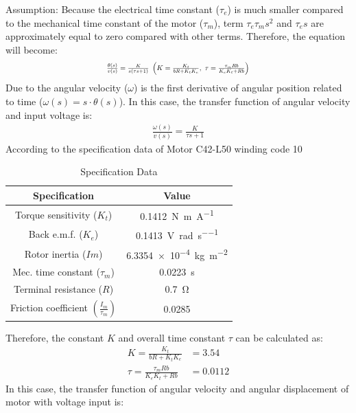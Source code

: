 \documentclass[conference]{IEEEtran}
\begin{document}
Assumption: Because the electrical time constant ($\tau_e$) is much smaller compared to the mechanical time constant of the motor ($\tau_m$), term $\tau_e\tau_ms^2$ and $\tau_es$ are approximately equal to zero compared with other terms. Therefore, the equation will become:
\begin{align}
    \resizebox{.43 \textwidth}{!}
    {$
    \frac{\theta (s)}{v(s)} = \frac{K}{s(\tau s + 1)} \ \left( K = \frac{K_t}{bR + K_t K_e}, \ \tau = \frac{\tau_m Rb}{K_e K_t + Rb} \right)
    $}
\end{align}
Due to the angular velocity ($\omega$) is the first derivative of angular position related to time ($\omega\left(s\right)=s\cdot\theta\left(s\right)$). In this case, the transfer function of angular velocity and input voltage is:
\begin{align}
    \frac{\omega(s)}{v(s)} = \frac{K}{\tau s + 1}
\end{align}
According to the specification data of Motor C42-L50 winding code 10 
\begin{table}[htbp]
    \caption{Specification Data \cite{b1}}
    \begin{center}
    \begin{tabular}{|c|c|}
    \hline
    \textbf{Specification} & \textbf{Value}\\
    \hline
    \hline
    Torque sensitivity ($K_t$) & \SI{0.1412}{\newton\metre\per\ampere}\\
    \hline
    Back e.m.f. ($K_e$) & \SI{0.1413}{\volt\per\radian\per\second}\\
    \hline
    Rotor inertia ($Im$) & \SI{6.3354e-4}{\kg\per\meter\squared}\\
    \hline
    Mec. time constant ($\tau_m$) & \SI{0.0223}{\second}\\
    \hline
    Terminal resistance ($R$) & \SI{0.7}{\ohm}\\
    \hline
    Friction coefficient $\left(\frac{I_m}{\tau_m}\right)$ & \SI{0.0285}{}\\
    \hline
    \end{tabular}
    \label{sdtable}
    \end{center}
\end{table}
Therefore, the constant $K$ and overall time constant $\tau$ can be calculated as:
\begin{align}
    K = \frac{K_t}{bR + K_t K_e} &= 3.54\\ 
    \tau = \frac{\tau_m Rb}{K_e K_t + Rb} &= 0.0112
\end{align}
In this case, the transfer function of angular velocity and angular displacement of motor with voltage input is:
\end{document}
